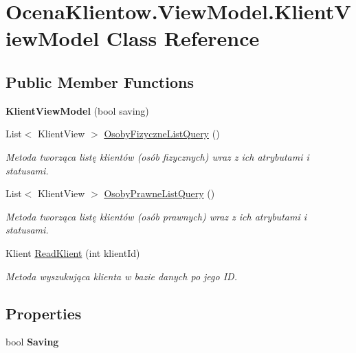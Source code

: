 \hypertarget{class_ocena_klientow_1_1_view_model_1_1_klient_view_model}{}\section{Ocena\+Klientow.\+View\+Model.\+Klient\+View\+Model Class Reference}
\label{class_ocena_klientow_1_1_view_model_1_1_klient_view_model}
\subsection*{Public Member Functions}
\begin{DoxyCompactItemize}
\item 
\hypertarget{class_ocena_klientow_1_1_view_model_1_1_klient_view_model_a6bfcba72d4be519a41344d4e7fbf57ff}{}\label{class_ocena_klientow_1_1_view_model_1_1_klient_view_model_a6bfcba72d4be519a41344d4e7fbf57ff} 
{\bfseries Klient\+View\+Model} (bool saving)
\item 
List$<$ Klient\+View $>$ \hyperlink{class_ocena_klientow_1_1_view_model_1_1_klient_view_model_aa8bae282d6c051d9172f227f6c20f37f}{Osoby\+Fizyczne\+List\+Query} ()
\begin{DoxyCompactList}\small\item\em Metoda tworząca listę klientów (osób fizycznych) wraz z ich atrybutami i statusami. \end{DoxyCompactList}\item 
List$<$ Klient\+View $>$ \hyperlink{class_ocena_klientow_1_1_view_model_1_1_klient_view_model_af5204f3b858c00e04d0fcd6192dcb7f7}{Osoby\+Prawne\+List\+Query} ()
\begin{DoxyCompactList}\small\item\em Metoda tworząca listę klientów (osób prawnych) wraz z ich atrybutami i statusami. \end{DoxyCompactList}\item 
Klient \hyperlink{class_ocena_klientow_1_1_view_model_1_1_klient_view_model_a85327fad1eb51fb198a8990f7685ed37}{Read\+Klient} (int klient\+Id)
\begin{DoxyCompactList}\small\item\em Metoda wyszukująca klienta w bazie danych po jego ID. \end{DoxyCompactList}\end{DoxyCompactItemize}
\subsection*{Properties}
\begin{DoxyCompactItemize}
\item 
\hypertarget{class_ocena_klientow_1_1_view_model_1_1_klient_view_model_a4611931cf303b9a39d3312c5cacbecd3}{}\label{class_ocena_klientow_1_1_view_model_1_1_klient_view_model_a4611931cf303b9a39d3312c5cacbecd3} 
bool {\bfseries Saving}
\end{DoxyCompactItemize}


